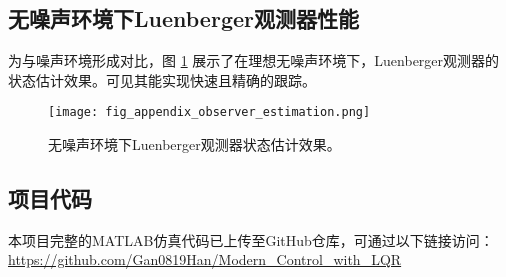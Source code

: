\documentclass[12pt, a4paper]{article}
\begin{document}
\subsection{无噪声环境下Luenberger观测器性能}
为与噪声环境形成对比，图 \ref{fig:appendix_observer} 展示了在理想无噪声环境下，Luenberger观测器的状态估计效果。可见其能实现快速且精确的跟踪。
\begin{figure}[htbp!]
    \centering
    \texttt{[image: fig\_appendix\_observer\_estimation.png]}
    \caption{无噪声环境下Luenberger观测器状态估计效果。}
    \label{fig:appendix_observer}
\end{figure}
\subsection{项目代码}
本项目完整的MATLAB仿真代码已上传至GitHub仓库，可通过以下链接访问：
\url{https://github.com/Gan0819Han/Modern_Control_with_LQR}
\end{document}
